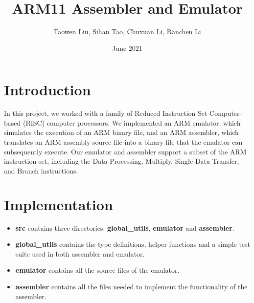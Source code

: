 \documentclass{article}
\title{ARM11 Assembler and Emulator}
\author{Taowen Liu, Sihan Tao, Chuxuan Li, Ranchen Li}
\date{June 2021}
\begin{document}
\maketitle

\section{Introduction}
In this project, we worked with a family of Reduced Instruction Set Computer-based (RISC) computer processors.
We implemented an ARM emulator, which simulates the execution of an ARM binary file, and an ARM assembler, which translates an ARM assembly source file into a binary file that the emulator can subsequently execute. Our emulator and assembler support a subset of the ARM instruction set, including 
the Data Processing, Multiply, Single Data Transfer, and Branch instructions.

\section{Implementation}
\begin{itemize}
    \item \textbf{src} contains three directories: \textbf{global\_utils}, \textbf{emulator} and \textbf{assembler}.
    \item \textbf{global\_utils} contains the type definitions, helper functions and a simple test suite used in both assembler and emulator.
    \item \textbf{emulator} contains all the source files of the emulator.
    \item \textbf{assembler} contains all the files needed to implement the functionality of the assembler.


\end{itemize}
\end{document}
